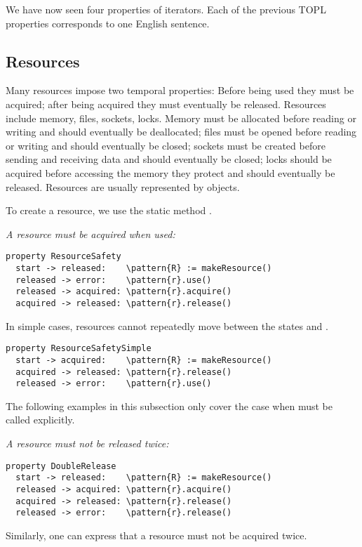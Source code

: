 \documentclass[preprint]{sigplanconf} %
\newcommand{\delimitVerbatim}{\par\nobreak\smallskip\noindent}
\newcommand{\pattern}[1]{\ensuremath{\mathtt{\underline{#1}}}}
\theoremstyle{definition}
\theoremstyle{remark}
\begin{document}
\medskip
We have now seen four properties of iterators.
Each of the previous TOPL properties corresponds to one English sentence.

\subsection{Resources} %

Many resources impose two temporal properties:
Before being used they must be acquired;
after being acquired they must eventually be released.
Resources include memory, files, sockets, locks.
Memory must be allocated before reading or writing and should eventually be deallocated;
files must be opened before reading or writing and should eventually be closed;
sockets must be created before sending and receiving data and should eventually be closed;
locks should be acquired before accessing the memory they protect and should eventually be released.
Resources are usually represented by objects.
\delimitVerbatim

\delimitVerbatim
To create a resource, we use the static method \Verb@makeResource@.

\medskip\emph{A resource must be acquired when used:}
\delimitVerbatim
\begin{Verbatim}[commandchars=\\\{\}]
property ResourceSafety
  start -> released:    \pattern{R} := makeResource()
  released -> error:    \pattern{r}.use()
  released -> acquired: \pattern{r}.acquire()
  acquired -> released: \pattern{r}.release()
\end{Verbatim}
\delimitVerbatim
In simple cases, resources cannot repeatedly move between the states \Verb@released@ and \Verb@acquired@.
\delimitVerbatim
\begin{Verbatim}[commandchars=\\\{\}]
property ResourceSafetySimple
  start -> acquired:    \pattern{R} := makeResource()
  acquired -> released: \pattern{r}.release()
  released -> error:    \pattern{r}.use()
\end{Verbatim}
\delimitVerbatim
The following examples in this subsection only cover the case when \Verb@acquire@ must be called explicitly.

\medskip\emph{A resource must not be released twice:}
\delimitVerbatim
\begin{Verbatim}[commandchars=\\\{\}]
property DoubleRelease
  start -> released:    \pattern{R} := makeResource()
  released -> acquired: \pattern{r}.acquire()
  acquired -> released: \pattern{r}.release()
  released -> error:    \pattern{r}.release()
\end{Verbatim}
\delimitVerbatim
Similarly, one can express that a resource must not be acquired twice.
\end{document}
